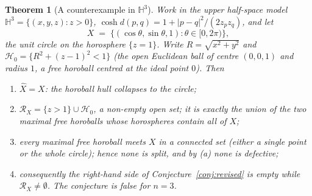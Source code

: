 \documentclass[11pt]{article}
\newtheorem{theorem}{Theorem}[section]
\theoremstyle{remark}
\newcommand{\X}{X}
\newcommand{\Xhat}{\widehat{\X}}
\newcommand{\Rx}{\mathcal{R}_{\X}}
\begin{document}
\begin{theorem}[A counterexample in $\mathbb{H}^{3}$]\label{thm:circle}
Work in the upper half-space model
$\mathbb{H}^{3}=\{(x,y,z):z>0\}$, $\cosh d(p,q)=1+\lvert
p-q\rvert^{2}/(2z_{p}z_{q})$, and let
\[
\X\;=\;\{(\cos\theta,\sin\theta,1):\theta\in[0,2\pi)\},
\]
the unit circle on the horosphere $\{z=1\}$. Write
$R=\sqrt{x^{2}+y^{2}}$ and
$\mathcal{H}_{0}=\{R^{2}+(z-1)^{2}<1\}$ (the open Euclidean ball of
centre $(0,0,1)$ and radius $1$, a free horoball centred at the ideal
point $0$). Then
\begin{enumerate}[label=(\alph*)]
\item $\Xhat=\X$: the horoball hull collapses to the circle;
\item $\Rx=\{z>1\}\cup\mathcal{H}_{0}$, a non-empty open set; it is
exactly the union of the two maximal free horoballs whose horospheres
contain all of $\X$;
\item every maximal free horoball meets $\X$ in a connected set
(either a single point or the whole circle); hence none is split,
and by \emph{(a)} none is defective;
\item consequently the right-hand side of
Conjecture~\ref{conj:revised} is empty while $\Rx\neq\emptyset$. The
conjecture is false for $n=3$.
\end{enumerate}
\end{theorem}
\end{document}
